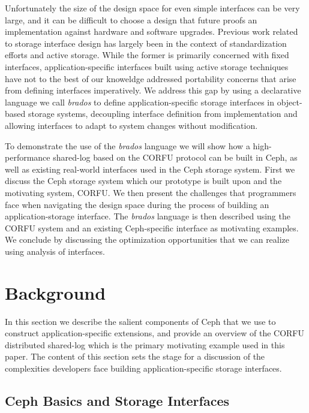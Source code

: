\documentclass[10pt,twocolumn]{article}
\begin{document}
Unfortunately the size of the design space for even simple interfaces can
be very large, and it can be difficult to choose a design that future proofs an
implementation against hardware and software upgrades.
Previous work related to storage interface design has largely been in the
context of standardization efforts and active storage. While the former is
primarily concerned with fixed interfaces, application-specific interfaces
built using active storage techniques have not to the best of our knoweldge
addressed portability concerns that arise from defining interfaces
imperatively. We address this gap by using a declarative language we call
\emph{brados} to define application-specific storage interfaces in
object-based storage systems, decoupling interface definition from
implementation and allowing interfaces to adapt to system changes without
modification.

To demonstrate the use of the \emph{brados} language we will show how a
high-performance shared-log based on the CORFU protocol can be built in Ceph, as well
as existing real-world interfaces used in the Ceph storage system. First we
discuss the Ceph storage system which our prototype is built upon and the 
motivating system, CORFU. We then present the challenges that programmers face
when navigating the design space during the process of building an
application-storage interface. The \emph{brados} language is then described
using the CORFU system and an existing Ceph-specific interface as motivating examples.
We conclude by discussing the optimization opportunities that we can realize
using analysis of interfaces. 

\section{Background}

In this section we describe the salient components of Ceph that we use to
construct application-specific extensions, and provide an overview of the
CORFU distributed shared-log which is the primary motivating example used in
this paper. The content of this section sets the stage for a discussion of the
complexities developers face building application-specific storage interfaces.

\subsection{Ceph Basics and Storage Interfaces}
\label{sec:objclass}
\end{document}
